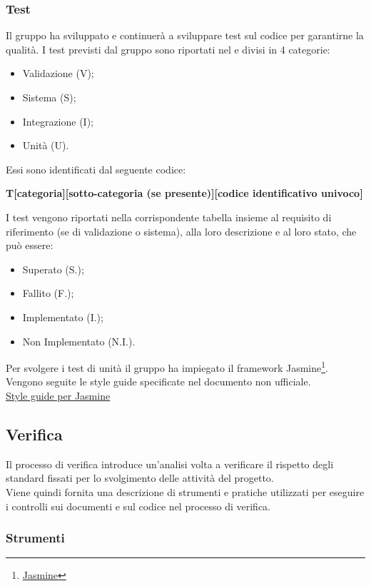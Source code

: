 \subsubsection{Test}\label{subsubsection:test}
Il gruppo \groupName{} ha sviluppato e continuerà a sviluppare test sul codice per garantirne la qualità. I test previsti dal gruppo \groupName{} sono riportati nel \docNameVersionPdQ{} e divisi in 4 categorie:
\begin{itemize}
	\item Validazione (V);
	\item Sistema (S);
	\item Integrazione (I);
	\item Unità (U).
\end{itemize}
Essi sono identificati dal seguente codice:\begin{center}\textbf{T[categoria][sotto-categoria (se presente)][codice identificativo univoco]}\end{center}
I test vengono riportati nella corrispondente tabella insieme al requisito di riferimento (se di validazione o sistema), alla loro descrizione e al loro stato, che può essere:
\begin{itemize}
	\item Superato (S.);
	\item Fallito (F.);
	\item Implementato (I.);
	\item Non Implementato (N.I.).
\end{itemize}
Per svolgere i test di unità il gruppo ha impiegato il framework Jasmine\footnote{\href{https://jasmine.github.io/}{Jasmine}}. 
Vengono seguite le style guide specificate nel documento non ufficiale.\\
\href{https://github.com/CareMessagePlatform/jasmine-styleguide}{Style guide per Jasmine}\\

\subsection{Verifica}\label{subsection:verifica}
Il processo di verifica introduce un'analisi volta a verificare il rispetto degli standard fissati per lo svolgimento delle attività del progetto.\\
Viene quindi fornita una descrizione di strumenti e pratiche utilizzati per eseguire i controlli sui documenti e sul codice nel processo di verifica.

\subsubsection{Strumenti}
